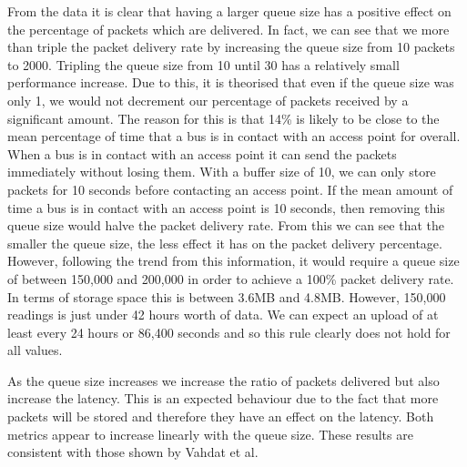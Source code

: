         From the data it is clear that having a larger queue size has a positive effect on the percentage of packets which are delivered. In fact, we can see that we more than triple the packet delivery rate by increasing the queue size from 10 packets to 2000. Tripling the queue size from 10 until 30 has a relatively small performance increase. Due to this, it is theorised that even if the queue size was only 1, we would not decrement our percentage of packets received by a significant amount. The reason for this is that 14\% is likely to be close to the mean percentage of time that a bus is in contact with an access point for overall. When a bus is in contact with an access point it can send the packets immediately without losing them. With a buffer size of 10, we can only store packets for 10 seconds before contacting an access point. If the mean amount of time a bus is in contact with an access point is 10 seconds, then removing this queue size would halve the packet delivery rate. From this we can see that the smaller the queue size, the less effect it has on the packet delivery percentage. However, following the trend from this information, it would require a queue size of between 150,000 and 200,000 in order to achieve a 100\% packet delivery rate. In terms of storage space this is between 3.6MB and 4.8MB. However, 150,000 readings is just under 42 hours worth of data. We can expect an upload of at least every 24 hours or 86,400 seconds and so this rule clearly does not hold for all values. 

        As the queue size increases we increase the ratio of packets delivered but also increase the latency. This is an expected behaviour due to the fact that more packets will be stored and therefore they have an effect on the latency. Both metrics appear to increase linearly with the queue size. These results are consistent with those shown by Vahdat et al.~\cite{vahdat2000epidemic}

